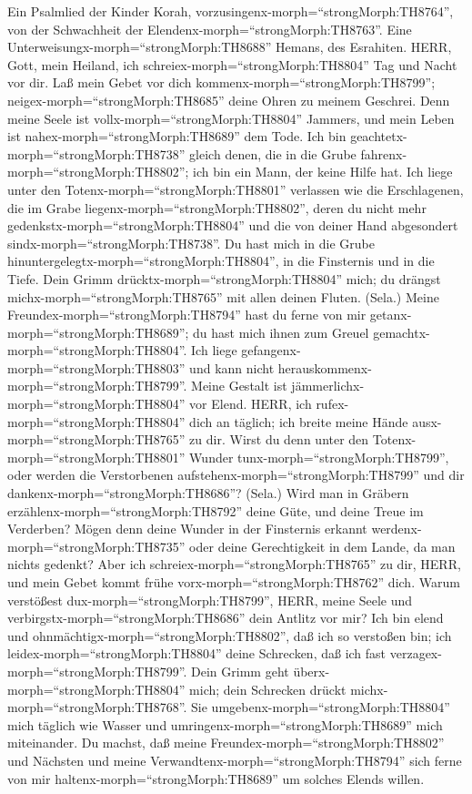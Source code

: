 Ein Psalmlied der Kinder Korah,
vorzusingenx-morph=``strongMorph:TH8764'', von der Schwachheit der
Elendenx-morph=``strongMorph:TH8763''. Eine
Unterweisungx-morph=``strongMorph:TH8688'' Hemans, des Esrahiten. HERR,
Gott, mein Heiland, ich schreiex-morph=``strongMorph:TH8804'' Tag und
Nacht vor dir.  Laß mein Gebet vor dich
kommenx-morph=``strongMorph:TH8799'';
neigex-morph=``strongMorph:TH8685'' deine Ohren zu meinem Geschrei.
 Denn meine Seele ist vollx-morph=``strongMorph:TH8804''
Jammers, und mein Leben ist nahex-morph=``strongMorph:TH8689'' dem Tode.
 Ich bin geachtetx-morph=``strongMorph:TH8738'' gleich
denen, die in die Grube fahrenx-morph=``strongMorph:TH8802''; ich bin
ein Mann, der keine Hilfe hat.  Ich liege unter den
Totenx-morph=``strongMorph:TH8801'' verlassen wie die Erschlagenen, die
im Grabe liegenx-morph=``strongMorph:TH8802'', deren du nicht mehr
gedenkstx-morph=``strongMorph:TH8804'' und die von deiner Hand
abgesondert sindx-morph=``strongMorph:TH8738''.  Du hast
mich in die Grube hinuntergelegtx-morph=``strongMorph:TH8804'', in die
Finsternis und in die Tiefe.  Dein Grimm
drücktx-morph=``strongMorph:TH8804'' mich; du drängst
michx-morph=``strongMorph:TH8765'' mit allen deinen Fluten. (Sela.)
 Meine Freundex-morph=``strongMorph:TH8794'' hast du ferne
von mir getanx-morph=``strongMorph:TH8689''; du hast mich ihnen zum
Greuel gemachtx-morph=``strongMorph:TH8804''. Ich liege
gefangenx-morph=``strongMorph:TH8803'' und kann nicht
herauskommenx-morph=``strongMorph:TH8799''.  Meine Gestalt
ist jämmerlichx-morph=``strongMorph:TH8804'' vor Elend. HERR, ich
rufex-morph=``strongMorph:TH8804'' dich an täglich; ich breite meine
Hände ausx-morph=``strongMorph:TH8765'' zu dir.  Wirst du
denn unter den Totenx-morph=``strongMorph:TH8801'' Wunder
tunx-morph=``strongMorph:TH8799'', oder werden die Verstorbenen
aufstehenx-morph=``strongMorph:TH8799'' und dir
dankenx-morph=``strongMorph:TH8686''? (Sela.)  Wird man in
Gräbern erzählenx-morph=``strongMorph:TH8792'' deine Güte, und deine
Treue im Verderben?  Mögen denn deine Wunder in der
Finsternis erkannt werdenx-morph=``strongMorph:TH8735'' oder deine
Gerechtigkeit in dem Lande, da man nichts gedenkt?  Aber
ich schreiex-morph=``strongMorph:TH8765'' zu dir, HERR, und mein Gebet
kommt frühe vorx-morph=``strongMorph:TH8762'' dich.  Warum
verstößest dux-morph=``strongMorph:TH8799'', HERR, meine Seele und
verbirgstx-morph=``strongMorph:TH8686'' dein Antlitz vor mir?
 Ich bin elend und
ohnmächtigx-morph=``strongMorph:TH8802'', daß ich so verstoßen bin; ich
leidex-morph=``strongMorph:TH8804'' deine Schrecken, daß ich fast
verzagex-morph=``strongMorph:TH8799''.  Dein Grimm geht
überx-morph=``strongMorph:TH8804'' mich; dein Schrecken drückt
michx-morph=``strongMorph:TH8768''.  Sie
umgebenx-morph=``strongMorph:TH8804'' mich täglich wie Wasser und
umringenx-morph=``strongMorph:TH8689'' mich miteinander. 
Du machst, daß meine Freundex-morph=``strongMorph:TH8802'' und Nächsten
und meine Verwandtenx-morph=``strongMorph:TH8794'' sich ferne von mir
haltenx-morph=``strongMorph:TH8689'' um solches Elends willen.

